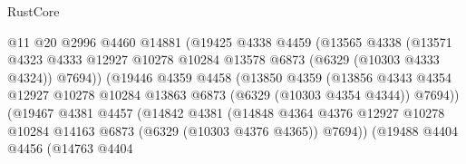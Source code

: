\begin{lexlean}{RustCore}
\begin{coremodule}
                                  @11
                                  @20
                                  @2996
                                  @4460
                                  @14881
                                  (@19425
                                    @4338
                                    @4459
                                    (@13565
                                      @4338
                                      (@13571
                                        @4323
                                        @4333
                                        @12927
                                        @10278
                                        @10284
                                        @13578
                                        @6873
                                        (@6329 (@10303 @4333 @4324))
                                        @7694))
                                    (@19446
                                      @4359
                                      @4458
                                      (@13850
                                        @4359
                                        (@13856
                                          @4343
                                          @4354
                                          @12927
                                          @10278
                                          @10284
                                          @13863
                                          @6873
                                          (@6329 (@10303 @4354 @4344))
                                          @7694))
                                      (@19467
                                        @4381
                                        @4457
                                        (@14842
                                          @4381
                                          (@14848
                                            @4364
                                            @4376
                                            @12927
                                            @10278
                                            @10284
                                            @14163
                                            @6873
                                            (@6329 (@10303 @4376 @4365))
                                            @7694))
                                        (@19488
                                          @4404
                                          @4456
                                          (@14763
                                            @4404

\end{coremodule}
\end{lexlean}
